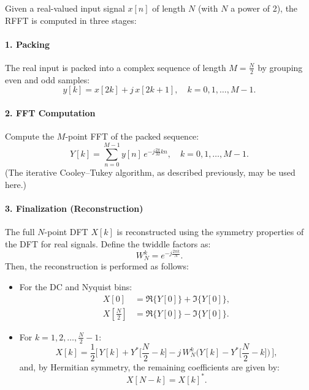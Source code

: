 \documentclass[12pt,letter]{article}
\begin{document}
Given a real-valued input signal \( x[n] \) of length \( N \) (with \( N \) a power of 2), the RFFT is computed in three stages:

\paragraph{1. Packing}
The real input is packed into a complex sequence of length \( M = \frac{N}{2} \) by grouping even and odd samples:
\begin{equation}
y[k] = x[2k] + j\,x[2k+1], \quad k = 0, 1, \dots, M-1.
\label{eq:packing}
\end{equation}

\paragraph{2. FFT Computation}
Compute the \( M \)-point FFT of the packed sequence:
\begin{equation}
Y[k] = \sum_{n=0}^{M-1} y[n] \, e^{-j \frac{2\pi}{M} k n}, \quad k = 0, 1, \dots, M-1.
\label{eq:fft-computation}
\end{equation}
(The iterative Cooley–Tukey algorithm, as described previously, may be used here.)

\paragraph{3. Finalization (Reconstruction)}
The full \( N \)-point DFT \( X[k] \) is reconstructed using the symmetry properties of the DFT for real signals. Define the twiddle factors as:
\[
W_N^k = e^{-j\frac{2\pi k}{N}}.
\]
Then, the reconstruction is performed as follows:
\begin{itemize}
  \item For the DC and Nyquist bins:
  \begin{align}
    X[0] &= \Re\{Y[0]\} + \Im\{Y[0]\}, \label{eq:dc}\\[1mm]
    X\left[\frac{N}{2}\right] &= \Re\{Y[0]\} - \Im\{Y[0]\}. \label{eq:nyquist}
  \end{align}
  \item For \( k = 1, 2, \dots, \frac{N}{2}-1 \):
  \begin{equation}
    X[k] = \frac{1}{2}\Big[\, Y[k] + Y^*\Big[\frac{N}{2}-k\Big] - j\,W_N^k\Big( Y[k] - Y^*\Big[\frac{N}{2}-k\Big] \Big)\,\Big],
    \label{eq:finalization}
  \end{equation}
  and, by Hermitian symmetry, the remaining coefficients are given by:
  \[
  X[N-k] = X[k]^*.
  \]
\end{itemize}
\end{document}
